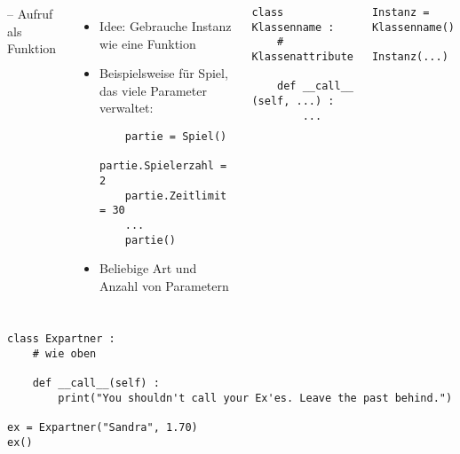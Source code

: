 
\begin{frame}[fragile]
%
\begin{columns}[T]
\begin{Large}
	{ -- Aufruf als Funktion}
\end{Large}
\vspace{6pt}
%
\begin{itemize}
\item Idee: Gebrauche Instanz wie eine Funktion
\item Beispielsweise für Spiel, das viele Parameter verwaltet:
	\begin{verbatim}
	partie = Spiel()
	partie.Spielerzahl = 2
	partie.Zeitlimit = 30
	...
	partie()
	\end{verbatim}
\item Beliebige Art und Anzahl von Parametern
\end{itemize}
%
\begin{codebox}
\begin{verbatim}
class Klassenname :
    # Klassenattribute
    
    def __call__ (self, ...) :
        ...

\end{verbatim}
\end{codebox}
%
\begin{codebox}
\begin{verbatim}
Instanz = Klassenname()

Instanz(...)
\end{verbatim}
\end{codebox}
\end{columns}
%
\end{frame}


\begin{frame}[fragile]
%
\begin{codebox}
\begin{verbatim}
class Expartner :
    # wie oben
    
    def __call__(self) :
        print("You shouldn't call your Ex'es. Leave the past behind.")

ex = Expartner("Sandra", 1.70)
ex()
\end{verbatim}
\end{codebox}
%
\end{frame}